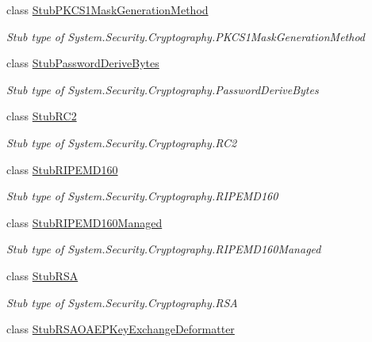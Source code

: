 \begin{DoxyCompactItemize}
class \hyperlink{class_system_1_1_security_1_1_cryptography_1_1_fakes_1_1_stub_p_k_c_s1_mask_generation_method}{Stub\-P\-K\-C\-S1\-Mask\-Generation\-Method}
\begin{DoxyCompactList}\small\item\em Stub type of System.\-Security.\-Cryptography.\-P\-K\-C\-S1\-Mask\-Generation\-Method\end{DoxyCompactList}\item 
class \hyperlink{class_system_1_1_security_1_1_cryptography_1_1_fakes_1_1_stub_password_derive_bytes}{Stub\-Password\-Derive\-Bytes}
\begin{DoxyCompactList}\small\item\em Stub type of System.\-Security.\-Cryptography.\-Password\-Derive\-Bytes\end{DoxyCompactList}\item 
class \hyperlink{class_system_1_1_security_1_1_cryptography_1_1_fakes_1_1_stub_r_c2}{Stub\-R\-C2}
\begin{DoxyCompactList}\small\item\em Stub type of System.\-Security.\-Cryptography.\-R\-C2\end{DoxyCompactList}\item 
class \hyperlink{class_system_1_1_security_1_1_cryptography_1_1_fakes_1_1_stub_r_i_p_e_m_d160}{Stub\-R\-I\-P\-E\-M\-D160}
\begin{DoxyCompactList}\small\item\em Stub type of System.\-Security.\-Cryptography.\-R\-I\-P\-E\-M\-D160\end{DoxyCompactList}\item 
class \hyperlink{class_system_1_1_security_1_1_cryptography_1_1_fakes_1_1_stub_r_i_p_e_m_d160_managed}{Stub\-R\-I\-P\-E\-M\-D160\-Managed}
\begin{DoxyCompactList}\small\item\em Stub type of System.\-Security.\-Cryptography.\-R\-I\-P\-E\-M\-D160\-Managed\end{DoxyCompactList}\item 
class \hyperlink{class_system_1_1_security_1_1_cryptography_1_1_fakes_1_1_stub_r_s_a}{Stub\-R\-S\-A}
\begin{DoxyCompactList}\small\item\em Stub type of System.\-Security.\-Cryptography.\-R\-S\-A\end{DoxyCompactList}\item 
class \hyperlink{class_system_1_1_security_1_1_cryptography_1_1_fakes_1_1_stub_r_s_a_o_a_e_p_key_exchange_deformatter}{Stub\-R\-S\-A\-O\-A\-E\-P\-Key\-Exchange\-Deformatter}

\end{DoxyCompactItemize}
